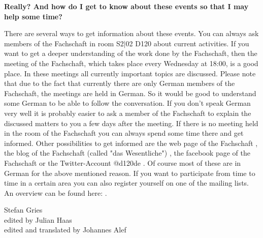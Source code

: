 {\textbf{Really? And how do I get to know about these events so that I may help some time?}

There are several ways to get information about these events. You can always ask members of the Fachschaft in room S2$|$02 D120 about current activities. If you want to get a deeper understanding of the work done by the Fachschaft, then the meeting of the Fachschaft, which takes place every Wednesday at 18:00, is a good place. In these meetings all currently important topics are discussed. Please note that due to the fact that currently there are only German members of the Fachschaft, the meetings are held in German. So it would be good to understand some German to be able to follow the conversation. If you don't speak German very well it is probably easier to ask a member of the Fachschaft to explain the discussed matters to you a few days after the meeting. If there is no meeting held in the room of the Fachschaft you can always spend some time there and get informed. Other possibilities to get informed are the web page of the Fachschaft \footnotemark[3], the blog of the Fachschaft (called "das Wesentliche") \footnotemark[4], the facebook page of the Fachschaft \footnotemark[5] or the Twitter-Account @d120de \footnotemark[6]. Of course most of these are in German for the above mentioned reason. If you want to participate from time to time in a certain area you can also register yourself on one of the mailing lists. An overview can be found here: \footnotemark[7].
}
{Stefan Gries\\
edited by Julian Haas\\
edited and translated by Johannes Alef}



